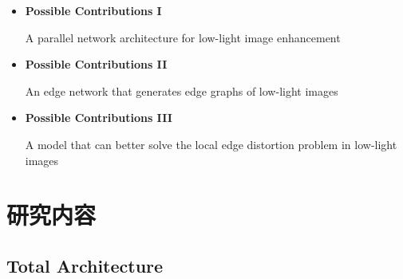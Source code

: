 \documentclass[CJK,aspectratio=169]{beamer}  %
\begin{document}
	\begin{frame}
		
		\begin{itemize} 
			\item \textbf{Possible Contributions I}
			
			A parallel network architecture for low-light image enhancement
			
			\item \textbf{Possible Contributions II}
			
			An edge network that generates edge graphs of low-light images
			
			\item \textbf{Possible Contributions III}
			
			A model that can better solve the local edge distortion problem in low-light images
		\end{itemize}
		
	\end{frame}
	
	
	\section{研究内容}
	
	\subsection{Total Architecture}
	
\end{document}
